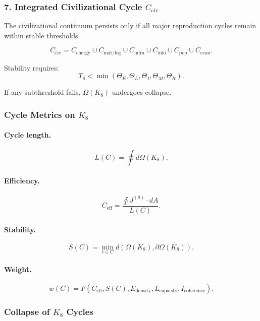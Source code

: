 \subsubsection{7. Integrated Civilizational Cycle $C_{\mathrm{civ}}$}

The civilizational continuum persists only if all major reproduction cycles
remain within stable thresholds.

\[
 C_{\mathrm{civ}}
   =
     C_{\mathrm{energy}}
     \cup C_{\mathrm{mat/log}}
     \cup C_{\mathrm{infra}}
     \cup C_{\mathrm{info}}
     \cup C_{\mathrm{pop}}
     \cup C_{\mathrm{econ}}.
\]

Stability requires:
\[
  T_8
   <
   \min(\Theta_E,\Theta_L,\Theta_I,\Theta_M,\Theta_R).
\]

If any subthreshold fails, $\Omega(K_8)$ undergoes collapse.

\subsubsection{Cycle Metrics on \texorpdfstring{$K_8$}{K_8}}

\paragraph{Cycle length.}
\[
  L(C) = \oint d\Omega(K_8).
\]

\paragraph{Efficiency.}
\[
  C_{\mathrm{eff}}
  = \frac{\oint J^{(8)}\cdot dA}{L(C)}.
\]

\paragraph{Stability.}
\[
  S(C)
    = \min_{t\in C}
      d(\Omega(K_8),\partial\Omega(K_8)).
\]

\paragraph{Weight.}
\[
 w(C)
 =
 F(C_{\mathrm{eff}},
   S(C),
   E_{\mathrm{density}},
   L_{\mathrm{capacity}},
   I_{\mathrm{coherence}}).
\]

\subsubsection{Collapse of \texorpdfstring{$K_8$}{K_8} Cycles}

